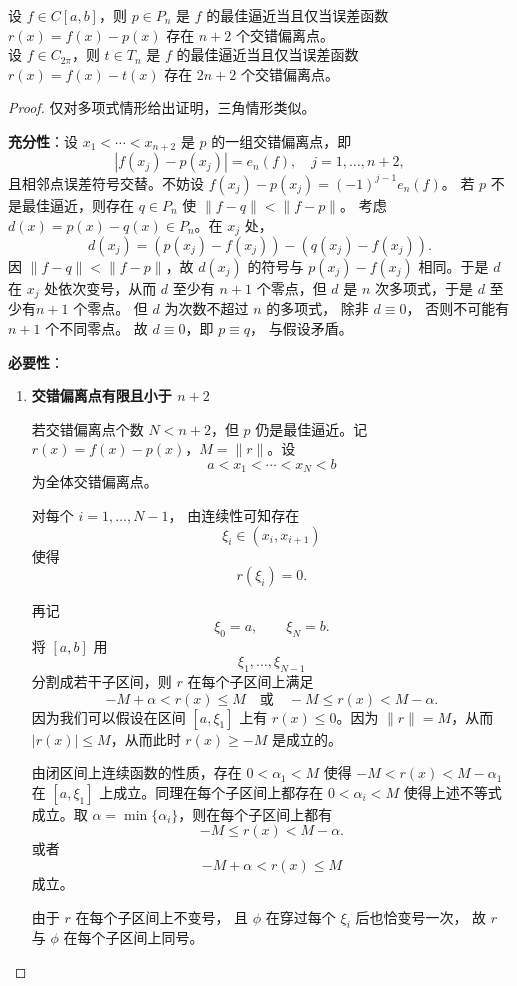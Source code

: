 \begin{theorem}[切比雪夫最佳逼近定理]
设 $f\in C[a,b]$，则 $p\in P_n$ 是 $f$ 的最佳逼近当且仅当误差函数 $r(x)=f(x)-p(x)$ 存在 $n+2$ 个交错偏离点。\\
设 $f\in C_{2\pi}$，则 $t\in T_n$ 是 $f$ 的最佳逼近当且仅当误差函数 $r(x)=f(x)-t(x)$ 存在 $2n+2$ 个交错偏离点。
\end{theorem}

\begin{proof}
仅对多项式情形给出证明，三角情形类似。

\textbf{充分性}：设 $x_1<\cdots<x_{n+2}$ 是 $p$ 的一组交错偏离点，即
\[
|f(x_j)-p(x_j)| = e_n(f),\quad j=1,\dots,n+2,
\]
且相邻点误差符号交替。不妨设 $f(x_j)-p(x_j) = (-1)^{j-1}e_n(f)$。
若 $p$ 不是最佳逼近，则存在 $q\in P_n$ 使 $\|f-q\| < \|f-p\|$。
考虑 $d(x)=p(x)-q(x)\in P_n$。在 $x_j$ 处，
\[
d(x_j) = (p(x_j)-f(x_j)) - (q(x_j)-f(x_j)).
\]
因 $\|f-q\|<\|f-p\|$，故 $d(x_j)$ 的符号与 $p(x_j)-f(x_j)$ 相同。于是 $d$ 在 $x_j$ 处依次变号，从而 $d$ 至少有 $n+1$ 个零点，但 $d$ 是 $n$ 次多项式，于是 $d$ 至少有$ n+1$ 个零点。
但 $d$ 为次数不超过 $n$ 的多项式，
除非 $d\equiv0$，
否则不可能有 $n+1$ 个不同零点。
故 $d\equiv0$，即 $p\equiv q$，
与假设矛盾。

\textbf{必要性}：
\begin{enumerate}
    \item \textbf{交错偏离点有限且小于 $n+2$} 

若交错偏离点个数 $N < n+2$，但 $p$ 仍是最佳逼近。记 $r(x)=f(x)-p(x)$，$M=\|r\|$。设
\[
a<x_1<\cdots<x_N<b
\]
为全体交错偏离点。

对每个 $i=1,\dots,N-1$，
由连续性可知存在
\[
\xi_i\in(x_i,x_{i+1})
\]
使得
\[
r(\xi_i)=0.
\]

再记
\[
\xi_0=a,\qquad \xi_N=b.
\]将 $[a,b]$ 用 $$\xi_1,\dots,\xi_{N-1}$$ 分割成若干子区间，则 $r$ 在每个子区间上满足
\[
-M+\alpha < r(x)  \leqslant M \quad\text{或}\quad -M  \leqslant r(x) < M-\alpha.
\]
因为我们可以假设在区间 $[a, \xi_1]$ 上有 $r(x)  \leqslant 0$。因为 $\|r\| = M$，从而 $|r(x)|  \leqslant  M$，从而此时 $r(x) \geqslant -M$ 是成立的。

由闭区间上连续函数的性质，存在 $0 < \alpha_1 < M $ 使得 $-M < r(x) < M -\alpha_1$ 在 $[a, \xi_1]$ 上成立。同理在每个子区间上都存在 $ 0 < \alpha_i < M $ 使得上述不等式成立。取 $\alpha = \min\{\alpha_i\}$，则在每个子区间上都有
\[-M   \leqslant  r(x) < M - \alpha.
\]或者
\[-M + \alpha < r(x)  \leqslant  M \]成立。

由于 $r$ 在每个子区间上不变号，
且 $\phi$ 在穿过每个 $\xi_i$ 后也恰变号一次，
故 $r$ 与 $\phi$ 在每个子区间上同号。


\end{enumerate}
\end{proof}
